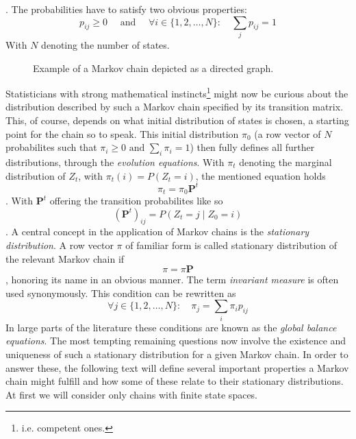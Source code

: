 \documentclass[12pt]{article}
\begin{document}
. The probabilities have to satisfy two obvious properties:
\[
p_{ij} \geq 0 \quad \text{ and } \quad \forall i \in \{1, 2, \dots , N\}: \quad \sum_j p_{ij} = 1
\]
With $N$ denoting the number of states.
\begin{figure}
\centering
{}
\caption{Example of a Markov chain depicted as a directed graph.}
\end{figure}
Statisticians with strong mathematical instincts\footnote{i.e. competent ones.} might now be curious about the distribution described by such a Markov chain specified by its transition matrix. This, of course, depends on what initial distribution of states is chosen, a starting point for the chain so to speak. This initial distribution $\pi_0$ (a row vector of $N$ probabilites such that $\pi_i \geq 0 \text{ and }\sum_i \pi_i = 1$) then fully defines all further distributions, through the \textit{evolution equations}. With $\pi_t$ denoting the marginal distribution of $Z_t$, with $\pi_t (i) = P(Z_t = i)$, the mentioned equation holds
\[
\pi_t = \pi_0 \textbf{P}^t
\].
With $\textbf{P}^t$ offering the transition probabilites like so
\[
(\textbf{P}^t)_{ij} = P(Z_t = j \mid Z_0 = i)
\].
A central concept in the application of Markov chains is the \textit{stationary distribution}. A row vector $\pi$ of familiar form is called stationary distribution of the relevant Markov chain if
\[
\pi = \pi \textbf{P}
\]
, honoring its name in an obvious manner. The term \textit{invariant measure} is often used synonymously. This condition can be rewritten as 
\[
\forall j \in \{1, 2, \dots , N\}: \quad \pi_j = \sum_i \pi_i p_{ij} 
\]
In large parts of the literature these conditions are known as the \textit{global balance equations}. The most tempting remaining questions now involve the existence and uniqueness of such a stationary distribution for a given Markov chain. In order to answer these, the following text will define several important properties a Markov chain might fulfill and how some of these relate to their stationary distributions. At first we will consider only chains with finite state spaces.\\
\end{document}
